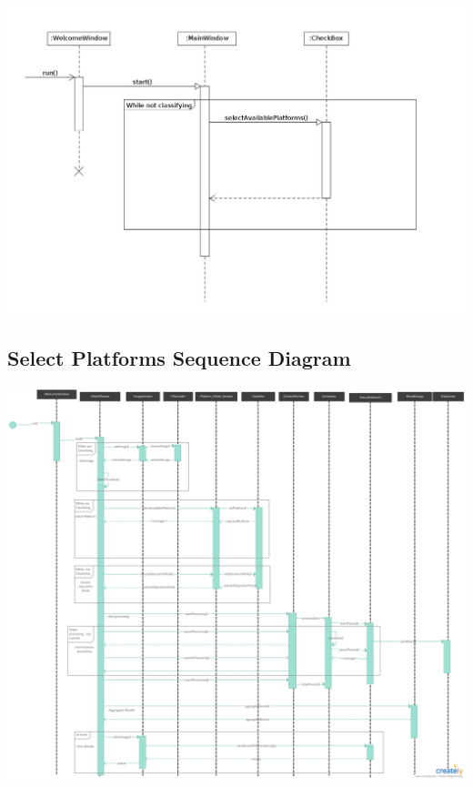\documentclass[parskip=full]{scrartcl}
\begin{document}
\begin{center}
\includegraphics[angle=90,origin=c,height=1.0\textwidth]{SelectPlatforms.jpg}
\end{center}

\subsection {Select Platforms Sequence Diagram}

\begin{center}
\includegraphics[angle=90,origin=c,height=1.0\textwidth]{seq.png}
\end{center}
\end{document}
